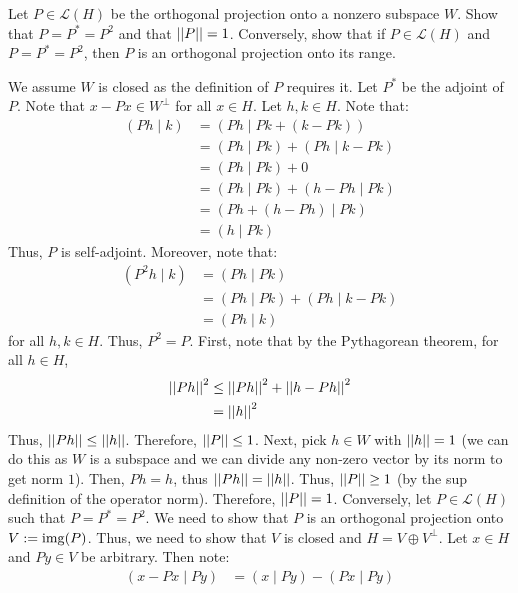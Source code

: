 \documentclass[12pt]{article}
\begin{document}
\begin{problem}{64}
    Let $P \in \mathcal{L}(H)$ be the orthogonal projection onto a nonzero subspace $W$. Show that $P = P^* = P^2$ and that $\left\vert\left\vert P\right\vert\right\vert = 1$. Conversely, show that if $P \in \mathcal{L}(H)$ and $P = P^* = P^2$, then $P$ is an orthogonal projection onto its range.
\end{problem}
\begin{solution}
    We assume $W$ is closed as the definition of $P$ requires it. Let $P^*$ be the adjoint of $P$. Note that $x - Px \in W^{\perp}$ for all $x \in H$. Let $h, k \in H$. Note that: 
    \begin{align*}
        (Ph \mid k) &= (Ph \mid Pk + (k - Pk)) \\
        &= (Ph \mid Pk) + (Ph \mid k-Pk) \\
        &= (Ph \mid Pk) + 0 \\
        &= (Ph \mid Pk) + (h-Ph \mid Pk) \\
        &= (Ph+(h-Ph) \mid Pk) \\
        &= (h \mid Pk)
    \end{align*}
    Thus, $P$ is self-adjoint. Moreover, note that: 
    \begin{align*}
        (P^2 h \mid k) &= (Ph \mid Pk) \\
        &= (Ph \mid Pk) + (Ph \mid k-Pk) \\
        &= (Ph \mid k)
    \end{align*}
    for all $h, k \in H$. Thus, $P^2 = P$. \bbni
    First, note that by the Pythagorean theorem, for all $h \in H$,
    \begin{align*}
        \left\vert\left\vert Ph\right\vert\right\vert^2 &\leq \left\vert\left\vert Ph\right\vert\right\vert^2 + \left\vert\left\vert h - Ph\right\vert\right\vert^2 \\
        &= \left\vert\left\vert h\right\vert\right\vert^2
    \end{align*}
    Thus, $\left\vert\left\vert Ph\right\vert\right\vert \leq \left\vert\left\vert h\right\vert\right\vert$. Therefore, $\left\vert\left\vert P\right\vert\right\vert \leq 1$. \bbni
    Next, pick $h \in W$ with $\left\vert\left\vert h\right\vert\right\vert = 1$ (we can do this as $W$ is a subspace and we can divide any non-zero vector by its norm to get norm $1$). Then, $Ph = h$, thus $\left\vert\left\vert Ph\right\vert\right\vert = \left\vert\left\vert h\right\vert\right\vert$. Thus, $\left\vert\left\vert P\right\vert\right\vert \geq 1$ (by the sup definition of the operator norm). Therefore, $\left\vert\left\vert P\right\vert\right\vert = 1$. \bbni
    Conversely, let $P \in \mathcal{L}(H)$ such that $P = P^* = P^2$. We need to show that $P$ is an orthogonal projection onto $V := \operatorname{img}(P)$. Thus, we need to show that $V$ is closed and $H = V \oplus V^\perp$. \bbni
    Let $x \in H$ and $Py \in V$ be arbitrary. Then note: 
    \begin{align*}
        (x-Px \mid Py) &= (x \mid Py) - (Px \mid Py) \\

\end{align*}
\end{solution}
\end{document}
